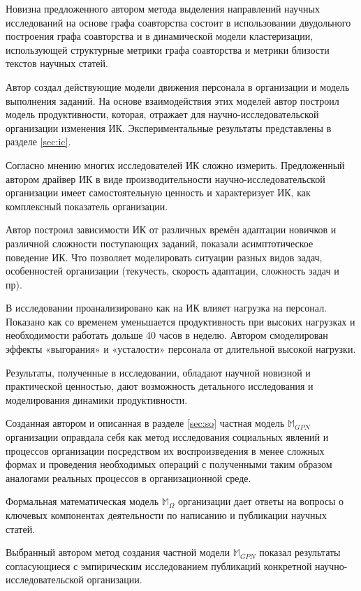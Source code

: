 Новизна предложенного автором метода выделения направлений научных исследований на основе графа соавторства состоит в использовании двудольного построения графа соавторства и в динамической модели кластеризации, использующей структурные метрики графа соавторства и метрики близости текстов научных статей.


Автор создал действующие модели движения персонала в организации и модель выполнения заданий. На основе взаимодействия этих моделей автор построил модель продуктивности, которая, отражает для научно-исследовательской организации изменения ИК. Экспериментальные результаты представлены в разделе \ref{sec:ic}.
 
Согласно мнению многих исследователей ИК сложно измерить. Предложенный автором драйвер ИК в виде производительности научно-исследовательской организации имеет самостоятельную ценность и характеризует ИК, как комплексный показатель организации.  

Автор построил зависимости ИК от различных времён адаптации новичков и различной сложности поступающих заданий, показали асимптотическое поведение ИК. Что позволяет моделировать ситуации разных видов задач, особенностей организации (текучесть, скорость адаптации, сложность задач и пр). 

В исследовании проанализировано как на ИК влияет нагрузка на персонал. Показано как со временем уменьшается продуктивность при высоких нагрузках и необходимости работать дольше 40 часов в неделю. Автором смоделирован эффекты «выгорания» и «усталости» персонала от длительной высокой нагрузки.

Результаты, полученные в исследовании, обладают научной новизной и практической ценностью, дают возможность детального исследования и моделирования динамики продуктивности.

Созданная автором и описанная в разделе \ref{sec:so} частная модель $\mathbb{M}_{GPN}$ организации оправдала себя как метод исследования социальных явлений и процессов организации посредством их воспроизведения в менее сложных формах и проведения необходимых операций с полученными таким образом аналогами реальных процессов в организационной среде.

Формальная математическая модель $\mathbb{M}_{\Omega}$ организации дает ответы на вопросы о ключевых компонентах деятельности по написанию и публикации научных статей.

Выбранный автором метод создания частной модели $\mathbb{M}_{GPN}$ показал результаты согласующиеся с эмпирическим исследованием публикаций конкретной научно-исследовательской организации.

